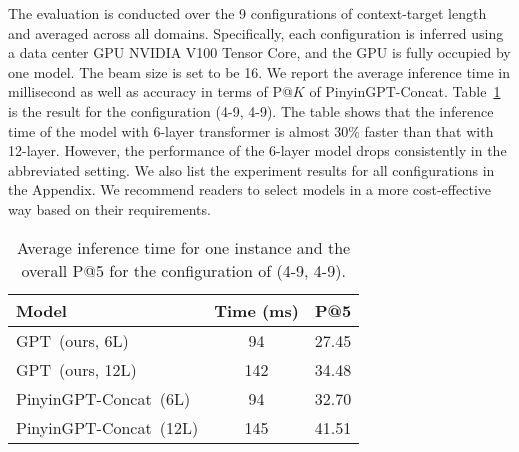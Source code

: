 The evaluation is conducted over the 9 configurations of context-target length and averaged across all domains.
Specifically, each configuration is inferred using a data center GPU NVIDIA V100 Tensor Core, and the GPU is fully occupied by one model.
The beam size is set to be 16.
We report the average inference time in millisecond as well as accuracy in terms of P@$K$ of PinyinGPT-Concat. 
Table~\ref{tab:trade-off-4-9} is the result for the configuration (4-9, 4-9).
The table shows that the inference time of the model with 6-layer transformer is almost 30\% faster than that with 12-layer.
However, the performance of the 6-layer model drops consistently in the abbreviated setting.
We also list the experiment results for all configurations in the Appendix.
We recommend readers to select models in a more cost-effective way based on their requirements.

\begin{table}[!htp]
\centering
\begin{tabular}{lcc}\toprule
Model &Time (ms) &P@5 \\\midrule
GPT~(ours, 6L) & 94 &27.45 \\
GPT~(ours, 12L) & 142 &34.48 \\
PinyinGPT-Concat~(6L) &94 &32.70 \\
PinyinGPT-Concat~(12L) &145 &41.51 \\
\bottomrule
\end{tabular}
\caption{Average inference time for one instance and the overall P@5 for the configuration of (4-9, 4-9). 
}
\label{tab:trade-off-4-9}
\end{table}
